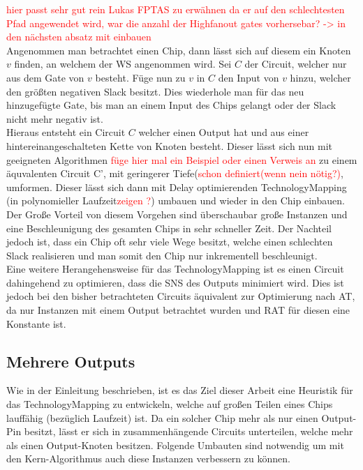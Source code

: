 \documentclass[11pt, a4paper, german]{article}
\newcommand{\TM}{TechnologyMapping }
\begin{document}
\textcolor{red}{hier passt sehr gut rein Lukas FPTAS zu erwähnen da er auf den schlechtesten Pfad angewendet wird, war die anzahl der Highfanout gates vorhersebar? -> in den nächsten absatz mit einbauen}\\

Angenommen man betrachtet einen Chip, dann lässt sich auf diesem ein Knoten $v$ finden, an welchem der WS angenommen wird. Sei $C$ der Circuit, welcher nur aus dem Gate von $v$ besteht. Füge nun zu $v$ in $C$ den Input von $v$ hinzu, welcher den größten negativen Slack besitzt. Dies wiederhole man für das neu hinzugefügte Gate, bis man an einem Input des Chips gelangt oder der Slack nicht mehr negativ ist. \\
Hieraus entsteht ein Circuit $C$ welcher einen Output hat und aus einer hintereinangeschalteten Kette von Knoten besteht. Dieser lässt sich nun mit geeigneten Algorithmen \textcolor{red}{füge hier mal ein Beispiel oder einen Verweis an} zu einem äquvalenten Circuit C', mit geringerer Tiefe(\textcolor{red}{schon definiert(wenn nein nötig?)}, umformen. Dieser lässt sich dann mit  Delay optimierenden \TM (in polynomieller Laufzeit\textcolor{red}{zeigen ?}) umbauen und wieder in den Chip einbauen. Der Große Vorteil von diesem Vorgehen sind überschaubar große Instanzen und eine Beschleunigung des gesamten Chips in sehr schneller Zeit. Der Nachteil jedoch ist, dass ein Chip oft sehr viele Wege besitzt, welche einen schlechten Slack realisieren und man somit den Chip nur inkrementell beschleunigt.\\

Eine weitere Herangehensweise für das \TM ist es einen Circuit dahingehend zu optimieren, dass die SNS des Outputs minimiert wird. Dies ist jedoch bei den bisher betrachteten Circuits äquivalent zur Optimierung nach AT, da nur Instanzen mit einem Output betrachtet wurden und RAT für diesen eine Konstante ist.

\subsection{Mehrere Outputs}
\label{subsec:mehrere_outputs}
Wie in der Einleitung beschrieben, ist es das Ziel dieser Arbeit eine Heuristik für das \TM zu entwickeln, welche auf großen Teilen eines Chips lauffähig (bezüglich Laufzeit) ist. Da ein solcher Chip mehr als nur einen Output-Pin besitzt, lässt er sich in zusammenhängende Circuits unterteilen, welche mehr als einen Output-Knoten besitzen. Folgende Umbauten sind notwendig um mit den Kern-Algorithmus auch diese Instanzen verbessern zu können.\\
\end{document}
